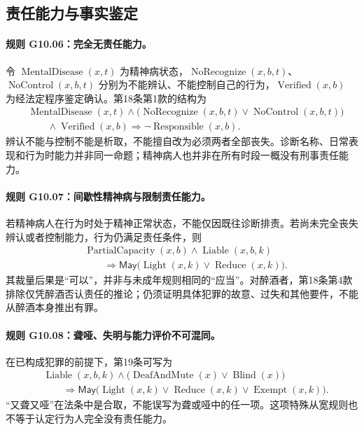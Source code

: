 \subsection{责任能力与事实鉴定}
\paragraph{规则 G10.06：完全无责任能力。}
令 $\operatorname{MentalDisease}(x,t)$ 为精神病状态，$\operatorname{NoRecognize}(x,b,t)$、$\operatorname{NoControl}(x,b,t)$ 分别为不能辨认、不能控制自己的行为，$\operatorname{Verified}(x,b)$ 为经法定程序鉴定确认。第18条第1款的结构为
\[
\begin{aligned}
&\operatorname{MentalDisease}(x,t)
\land\bigl(\operatorname{NoRecognize}(x,b,t)\lor\operatorname{NoControl}(x,b,t)\bigr)\\
&\qquad\land\operatorname{Verified}(x,b)
\Longrightarrow\neg\operatorname{Responsible}(x,b).
\end{aligned}
\]
辨认不能与控制不能是析取，不能擅自改为必须两者全部丧失。诊断名称、日常表现和行为时能力并非同一命题；精神病人也并非在所有时段一概没有刑事责任能力。

\paragraph{规则 G10.07：间歇性精神病与限制责任能力。}
若精神病人在行为时处于精神正常状态，不能仅因既往诊断排责。若尚未完全丧失辨认或者控制能力，行为仍满足责任条件，则
\[
\begin{aligned}
&\operatorname{PartialCapacity}(x,b)\land\operatorname{Liable}(x,b,k)\\
&\qquad\Longrightarrow\mathsf{May}\bigl(\operatorname{Light}(x,k)\lor\operatorname{Reduce}(x,k)\bigr).
\end{aligned}
\]
其裁量后果是“可以”，并非与未成年规则相同的“应当”。对醉酒者，第18条第4款排除仅凭醉酒否认责任的推论；仍须证明具体犯罪的故意、过失和其他要件，不能从醉酒本身推出有罪。

\paragraph{规则 G10.08：聋哑、失明与能力评价不可混同。}
在已构成犯罪的前提下，第19条可写为
\[
\begin{aligned}
&\operatorname{Liable}(x,b,k)
\land\bigl(\operatorname{DeafAndMute}(x)\lor\operatorname{Blind}(x)\bigr)\\
&\qquad\Longrightarrow\mathsf{May}\bigl(\operatorname{Light}(x,k)
\lor\operatorname{Reduce}(x,k)\lor\operatorname{Exempt}(x,k)\bigr).
\end{aligned}
\]
“又聋又哑”在法条中是合取，不能误写为聋或哑中的任一项。这项特殊从宽规则也不等于认定行为人完全没有责任能力。

